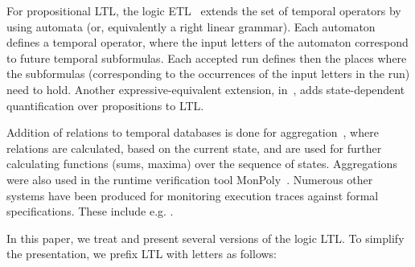 
\vspace{1ex}
For propositional LTL, the logic ETL~\cite{WVS,Wolper} extends
the set of temporal operators 
by using automata (or, equivalently a right linear grammar). Each automaton defines a temporal operator,
where the input letters of the automaton correspond to future temporal subformulas. Each accepted run defines then the places
where the subformulas (corresponding to the occurrences of the input letters in the run) need to hold. Another expressive-equivalent extension, 
in~\cite{Wolper}, adds
state-dependent quantification over propositions to LTL.

Addition of relations to temporal databases is done
for aggregation~\cite{Libkin}, where relations are
calculated, based on the current state, and are used for further calculating
functions (sums, maxima) over the sequence of states. Aggregations were also used in the runtime verification tool 
{\sf MonPoly}~\cite{agrebasin}.
%
%
Numerous other systems have been produced for monitoring
execution traces against formal specifications. 
These include e.g. \cite{Meredith2011,larva,Reger2015,halle-beepbeep-ieee-12,LOLA}. 

\vspace{1ex}
\label{sec:prelim}
In this paper, we treat and present several versions of the logic LTL. To simplify
the presentation, we prefix LTL with letters as follows:

